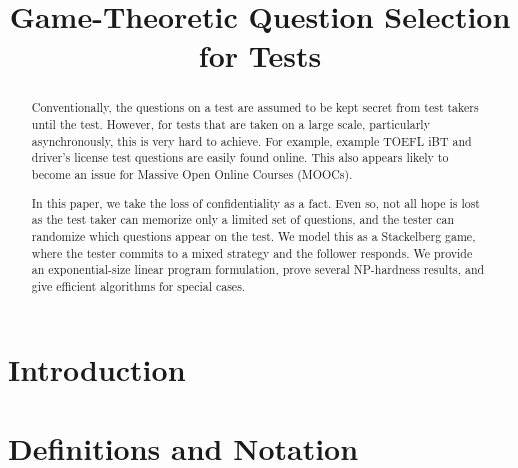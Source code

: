 \documentclass{article}
\title{Game-Theoretic Question Selection for Tests}
\begin{document}
\maketitle

\begin{abstract}
Conventionally, the questions on a test are assumed to be kept secret
from test takers until the test.  However, for tests that are taken on
a large scale, particularly asynchronously, this is very hard to
achieve.  For example, example TOEFL iBT and driver's license test
questions are easily found online.  This also appears likely to become
an issue for Massive Open Online Courses (MOOCs).

In this paper, we take the loss of confidentiality as a fact.  Even
so, not all hope is lost as the test taker can memorize only a limited
set of questions, and the tester can randomize which questions appear on
the test.  We model this as a Stackelberg game, where the tester
commits to a mixed strategy and the follower responds.  We provide an
exponential-size linear program formulation, prove several NP-hardness
results, and give efficient algorithms for special cases.
\end{abstract}

\section{Introduction}

\section{Definitions and Notation}

\end{document}
